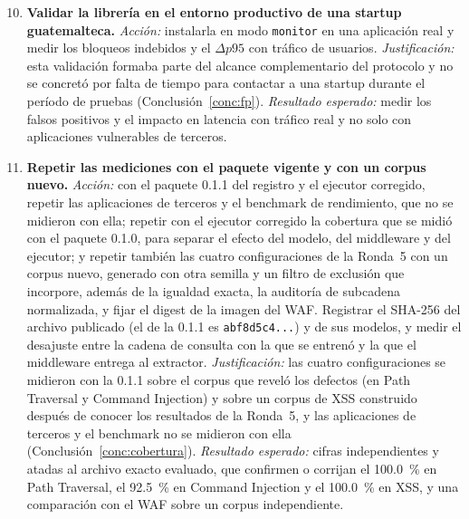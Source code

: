\begin{enumerate}
    \setcounter{enumi}{9}
    \item \textbf{Validar la librería en el entorno productivo de una startup guatemalteca.}
    \textit{Acción:} instalarla en modo \texttt{monitor} en una aplicación real y medir los
    bloqueos indebidos y el $\Delta p95$ con tráfico de usuarios. \textit{Justificación:} esta
    validación formaba parte del alcance complementario del protocolo y no se concretó por falta de
    tiempo para contactar a una startup durante el período de pruebas (Conclusión~\ref{conc:fp}).
    \textit{Resultado esperado:} medir los falsos positivos y el impacto en latencia con tráfico
    real y no solo con aplicaciones vulnerables de terceros.

    \item \textbf{Repetir las mediciones con el paquete vigente y con un corpus nuevo.}
    \textit{Acción:} con el paquete 0.1.1 del registro y el ejecutor corregido, repetir las
    aplicaciones de terceros y el benchmark de rendimiento, que no se midieron con ella; repetir con
    el ejecutor corregido la cobertura que se midió con el paquete 0.1.0, para separar el efecto del
    modelo, del middleware y del ejecutor; y repetir también las cuatro configuraciones de la Ronda~5 con un corpus nuevo, generado con otra semilla y un
    filtro de exclusión que incorpore, además de la igualdad exacta, la auditoría de subcadena
    normalizada, y fijar el digest de la imagen del WAF. Registrar el SHA-256
    del archivo publicado (el de la 0.1.1 es \texttt{abf8d5c4...}) y de sus modelos, y medir el
    desajuste entre la cadena de consulta con la que se entrenó y la que el middleware entrega al
    extractor. \textit{Justificación:} las cuatro configuraciones se midieron con la 0.1.1 sobre el corpus
    que reveló los defectos (en Path Traversal y Command Injection) y sobre un corpus de XSS
    construido después de conocer los resultados de la Ronda~5, y las aplicaciones de terceros y
    el benchmark no se midieron con ella (Conclusión~\ref{conc:cobertura}). \textit{Resultado
    esperado:} cifras independientes y atadas al archivo exacto evaluado, que confirmen o corrijan
    el 100.0~\% en Path Traversal, el 92.5~\% en Command Injection y el 100.0~\% en XSS, y una
    comparación con el WAF sobre un corpus independiente.


\end{enumerate}
